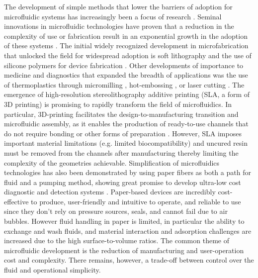 The development of simple methods that lower the barriers of adoption for microfluidic systems has increasingly been a focus of research \cite{Berthier2013,Casavant2013b, Du2009, Guckenberger2015, Walker2002, Young2011}. Seminal innovations in microfluidic technologies have proven that a reduction in the complexity of use or fabrication result in an exponential growth in the adoption of these systems \cite{Berthier2012,Sackmann2014a}. The initial widely recognized development in microfabrication that unlocked the field for widespread adoption is soft lithography and the use of silicone polymers for device fabrication \cite{Sia2003a}. Other developments of importance to medicine and diagnostics that expanded the breadth of applications was the use of thermoplastics through micromilling \cite{Guckenberger2015b, Wilson2011}, hot-embossing \cite{Young2011}, or laser cutting \cite{Klank2002, Yuen2009MultidimensionalSystem}. The emergence of high-resolution stereolithography additive printing (SLA, a form of 3D printing) is promising to rapidly transform the field of microfluidics. In particular, 3D-printing facilitates the design-to-manufacturing transition and microfluidic assembly, as it enables the production of ready-to-use channels that do not require bonding or other forms of preparation \cite{Au2014, Bhargava2014}. However, SLA imposes important material limitations (e.g. limited biocompatibility) and uncured resin must be removed from the channels after manufacturing thereby limiting the complexity of the geometries achievable. Simplification of microfluidics technologies has also been demonstrated by using paper fibers as both a path for fluid and a pumping method, showing great promise to develop ultra-low cost diagnostic and detection systems \cite{Martinez2008, Osborn2010a, Park2013a}. Paper-based devices are incredibly cost-effective to produce, user-friendly and intuitive to operate, and reliable to use since they don’t rely on pressure sources, seals, and cannot fail due to air bubbles. However fluid handling in paper is limited, in particular the ability to exchange and wash fluids, and material interaction and adsorption challenges are increased due to the high surface-to-volume ratios. The common theme of microfluidic development is the reduction of manufacturing and user-operation cost and complexity. There remains, however, a trade-off between control over the fluid and operational simplicity.

